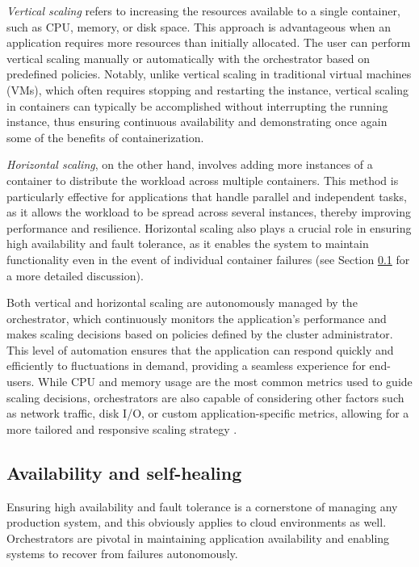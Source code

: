 \textit{Vertical scaling} refers to increasing the resources available to a single
container, such as CPU, memory, or disk space.
This approach is advantageous when an application requires more resources than
initially allocated.
The user can perform vertical scaling manually or automatically with the
orchestrator based on predefined policies.
Notably, unlike vertical scaling in traditional virtual machines (VMs), which
often requires stopping and restarting the instance, vertical scaling in
containers can typically be accomplished without interrupting the running
instance, thus ensuring continuous availability and demonstrating once again
some of the benefits of containerization.

\textit{Horizontal scaling}, on the other hand, involves adding more instances of a
container to distribute the workload across multiple containers.
This method is particularly effective for applications that handle parallel and
independent tasks, as it allows the workload to be spread across several
instances, thereby improving performance and resilience.
Horizontal scaling also plays a crucial role in ensuring high availability and
fault tolerance, as it enables the system to maintain functionality even in the
event of individual container failures (see Section
\ref{subsec:chpt1-availability} for a more detailed discussion).

Both vertical and horizontal scaling are autonomously managed by the
orchestrator, which continuously monitors the application's performance and
makes scaling decisions based on policies defined by the cluster administrator.
This level of automation ensures that the application can respond quickly and
efficiently to fluctuations in demand, providing a seamless experience for
end-users.
While CPU and memory usage are the most common metrics used to guide scaling
decisions, orchestrators are also capable of considering other factors such as
network traffic, disk I/O, or custom application-specific metrics, allowing for
a more tailored and responsive scaling strategy \cite{Qu2016}.

\subsection{Availability and self-healing}\label{subsec:chpt1-availability}

Ensuring high availability and fault tolerance is a cornerstone of managing any
production system, and this obviously applies to cloud environments as well.
Orchestrators are pivotal in maintaining application availability and enabling
systems to recover from failures autonomously.

